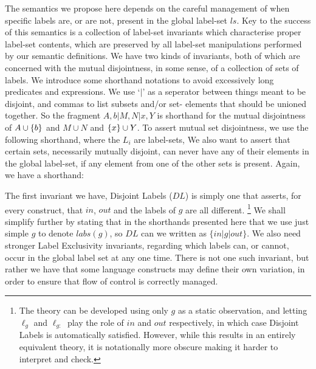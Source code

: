 The semantics we propose here depends on the careful management
of when specific labels are, or are not,
present in the global label-set $ls$.
Key to the success of this semantics is a collection of label-set invariants
which characterise proper label-set contents,
which are preserved by all label-set manipulations performed
by our semantic definitions.
We have two kinds of invariants,
both of which are concerned with the mutual disjointness, in some sense,
of a collection of sets of labels.
We introduce some shorthand notations
to avoid excessively long predicates and expressions.
We use `$\mid$' as a seperator between things meant to be disjoint,
and commas to list subsets and/or set- elements that should be unioned together.
So the fragment $ A,b | M,N | x,Y $
is shorthand for the mutual disjointness of
$A \cup \{{b}\}$ and $M \cup N$ and $\{{x}\} \cup Y$.
To assert mutual set disjointness,
we use the following shorthand, where the $L_i$ are label-sets,
We also want to assert that certain sets, necessarily mutually disjoint,
can never have any of their elements in the global label-set,
if any element from one of the other sets is present.
Again, we have a shorthand:

The first invariant we have, Disjoint Labels ($DL$) is simply one that asserts,
for every construct, that $in$, $out$ and the labels of $g$
are all different.
\footnote{The theory can be developed using only $g$ as a static observation,
and letting $\ell_g$ and $\ell_{g:}$ play the role of $in$ and $out$
respectively, in which case Disjoint Labels is automatically satisfied.
However, while this results in an entirely equivalent theory,
it is notationally more obscure
making it harder to interpret and check.
}%
We shall simplify further by stating that in the shorthands presented
here that we use just simple $g$ to denote $labs(g)$,
so $DL$ can we written as $\{in|g|out\}$.
We also need stronger Label Exclusivity invariants,
regarding which labels can, or cannot,
occur in the global label set at any one time.
There is not one such invariant,
but rather we have that some language constructs may define their own
variation, in order to ensure that flow of control is correctly managed.

